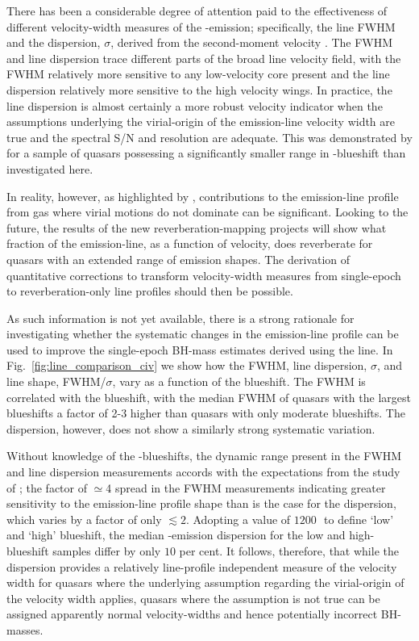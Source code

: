 There has been a considerable degree of attention paid to the effectiveness of different velocity-width measures of the -emission; specifically, the line FWHM and the dispersion, $\sigma$, derived from the second-moment velocity \citep[e.g.][]{assef11, denney13}.
The FWHM and line dispersion trace different parts of the broad line velocity field, with the FWHM relatively more sensitive to any low-velocity core present and the line dispersion relatively more sensitive to the high velocity wings. 
In practice, the line dispersion is almost certainly a more robust velocity indicator when the assumptions underlying the virial-origin of the emission-line velocity width are true and the spectral S/N and resolution are adequate.
This was demonstrated by \citet{denney13} for a sample of quasars possessing a significantly smaller range in -blueshift than investigated here.

In reality, however, as highlighted by \citet{denney12}, contributions to the  emission-line profile from gas where virial motions do not dominate can be significant. 
Looking to the future, the results of the new reverberation-mapping projects \citep{shen15, kingoz15} will show what fraction of the  emission-line, as a function of velocity, does reverberate for quasars with an extended range of  emission shapes. 
The derivation of quantitative corrections to transform velocity-width measures from single-epoch to reverberation-only line profiles should then be possible. 

As such information is not yet available, there is a strong rationale for investigating whether the systematic changes in the  emission-line profile can be used to improve the single-epoch BH-mass estimates derived using the  line. 
In Fig.~\ref{fig:line_comparison_civ} we show how the  FWHM, line dispersion, $\sigma$, and line shape, FWHM/$\sigma$, vary as a function of the blueshift. 
The  FWHM is correlated with the blueshift, with the median FWHM of quasars with the largest blueshifts a factor of 2-3 higher than quasars with only moderate blueshifts.
The dispersion, however, does not show a similarly strong systematic variation. 

Without knowledge of the -blueshifts, the dynamic range present in the FWHM and line dispersion measurements accords with the expectations from the study of \citet{denney13}; the factor of $\simeq$4 spread in the FWHM measurements indicating greater sensitivity to the emission-line profile shape than is the case for the dispersion, which varies by a factor of only $\lesssim2$.
Adopting a value of $1200$\,\kms\, to define `low' and `high' blueshift, the median -emission dispersion for the low and high-blueshift samples differ by only $10$ per cent. 
It follows, therefore, that while the dispersion provides a relatively line-profile independent measure of the velocity width for quasars where the underlying assumption regarding the virial-origin of the velocity width applies, quasars where the assumption is not true can be assigned apparently normal velocity-widths and hence potentially incorrect BH-masses. 

